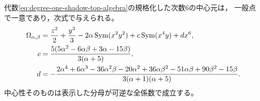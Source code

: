\begin{proposition}[最高活性中心の明示式]
\label{prop:degree-one-shadow-top-center}
代数\eqref{eq:degree-one-shadow-top-algebra}の規格化した次数6の中心元は，
一般点で一意であり，次式で与えられる。
\begin{align}
 \Omega_{\alpha,\beta}
   &={z^2\over2}+{y^3\over3}
       -2\alpha\operatorname{Sym}(x^2y^2)
       +c\operatorname{Sym}(x^4y)+d x^6,\label{eq:degree-one-shadow-top-center}\\
 c&={5(5\alpha^2-6\alpha\beta+3\alpha-15\beta)
                \over3(\alpha+5)},\label{eq:degree-one-shadow-top-c}\\
 d&=-{2\alpha^4+6\alpha^3-36\alpha^2\beta-20\alpha^2
          +36\alpha\beta^2-51\alpha\beta+90\beta^2-15\beta
                \over3(\alpha+1)(\alpha+5)}.
       \label{eq:degree-one-shadow-top-d}
\end{align}
中心性そのものは表示した分母が可逆な全係数で成立する。
\end{proposition}
